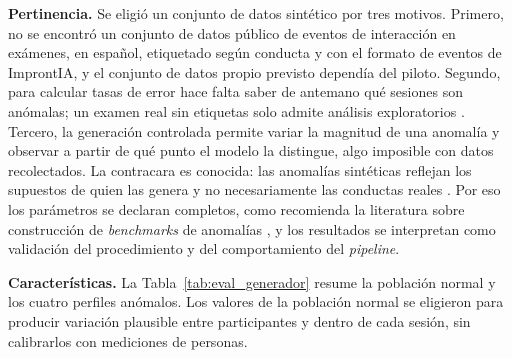 \textbf{Pertinencia.} Se eligió un conjunto de datos sintético por tres motivos. Primero, no se encontró un conjunto de datos público de eventos de interacción en exámenes, en español, etiquetado según conducta y con el formato de eventos de ImprontIA, y el conjunto de datos propio previsto dependía del piloto. Segundo, para calcular tasas de error hace falta saber de antemano qué sesiones son anómalas; un examen real sin etiquetas solo admite análisis exploratorios \parencite{Akcapinar2025}. Tercero, la generación controlada permite variar la magnitud de una anomalía y observar a partir de qué punto el modelo la distingue, algo imposible con datos recolectados. La contracara es conocida: las anomalías sintéticas reflejan los supuestos de quien las genera y no necesariamente las conductas reales \parencite{Emmott2013, Campos2016}. Por eso los parámetros se declaran completos, como recomienda la literatura sobre construcción de \textit{benchmarks} de anomalías \parencite{Emmott2013}, y los resultados se interpretan como validación del procedimiento y del comportamiento del \textit{pipeline}.

\textbf{Características.} La Tabla~\ref{tab:eval_generador} resume la población normal y los cuatro perfiles anómalos. Los valores de la población normal se eligieron para producir variación plausible entre participantes y dentro de cada sesión, sin calibrarlos con mediciones de personas.


